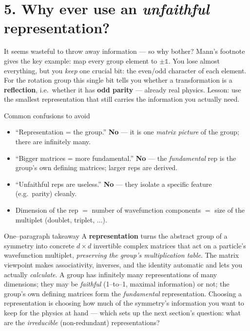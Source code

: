 \documentclass[11pt]{article}
\begin{document}
\section*{5. Why ever use an \emph{unfaithful} representation?}

It seems wasteful to throw away information --- so why bother? Mann's footnote
gives the key example: map every group element to $\pm\mathbb{1}$. You lose
almost everything, but you \emph{keep} one crucial bit: the even/odd character
of each element. For the rotation group this single bit tells you whether a
transformation is a \textbf{reflection}, i.e.\ whether it has \textbf{odd
parity} --- already real physics. Lesson: use the smallest representation that
still carries the information you actually need.

\begin{watchbox}{Common confusions to avoid}
\begin{itemize}[leftmargin=1.2em, itemsep=2pt]
  \item ``Representation = the group.'' \textbf{No} --- it is one \emph{matrix
        picture} of the group; there are infinitely many.
  \item ``Bigger matrices = more fundamental.'' \textbf{No} --- the
        \emph{fundamental} rep is the group's own defining matrices; larger
        reps are derived.
  \item ``Unfaithful reps are useless.'' \textbf{No} --- they isolate a
        specific feature (e.g.\ parity) cleanly.
  \item Dimension of the rep $=$ number of wavefunction components $=$ size of
        the multiplet (doublet, triplet, $\dots$).
\end{itemize}
\end{watchbox}

\begin{keybox}{One--paragraph takeaway}
A \textbf{representation} turns the abstract group of a symmetry into concrete
$d\times d$ invertible complex matrices that act on a particle's wavefunction
multiplet, \emph{preserving the group's multiplication table}. The matrix
viewpoint makes associativity, inverses, and the identity automatic and lets
you actually \emph{calculate}. A group has infinitely many representations of
many dimensions; they may be \emph{faithful} (1--to--1, maximal information)
or not; the group's own defining matrices form the \emph{fundamental}
representation. Choosing a representation is choosing how much of the
symmetry's information you want to keep for the physics at hand --- which sets
up the next section's question: what are the \emph{irreducible} (non-redundant)
representations?
\end{keybox}
\end{document}
